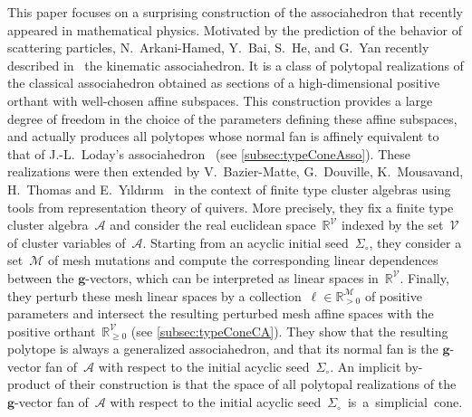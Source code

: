 \documentclass{amsart}
\theoremstyle{definition}
\newcommand{\R}{\mathbb{R}} %
\newcommand{\cal}[1]{{\mathcal{#1}}} %
\renewcommand{\b}[1]{{\boldsymbol{#1}}} %
\newcommand{\seed}{\Sigma} %
\begin{document}
This paper focuses on a surprising construction of the associahedron that recently appeared in mathematical physics.
Motivated by the prediction of the behavior of scattering particles, N.~Arkani-Hamed, Y.~Bai, S.~He, and G.~Yan recently described in~\cite[Sect.~3.2]{ArkaniHamedBaiHeYan} the kinematic associahedron.
It is a class of polytopal realizations of the classical associahedron obtained as sections of a high-dimensional positive orthant with well-chosen affine subspaces.
This construction provides a large degree of freedom in the choice of the parameters defining these affine subspaces, and actually produces all polytopes whose normal fan is affinely equivalent to that of J.-L.~Loday's associahedron~\cite{Loday} (see \cref{subsec:typeConeAsso}).
These realizations were then extended by V.~Bazier-Matte, G.~Douville, K.~Mousavand, H.~Thomas and E.~Y\i ld\i r\i m~\cite{BazierMatteDouvilleMousavandThomasYildirim} in the context of finite type cluster algebras using tools from representation theory of quivers.
More precisely, they fix a finite type cluster algebra~$\cal{A}$ and consider the real euclidean space~$\R^\cal{V}$ indexed by the set~$\cal{V}$ of cluster variables of~$\cal{A}$.
Starting from an acyclic initial seed~$\seed_\circ$, they consider a set~$\cal{M}$ of mesh mutations and compute the corresponding linear dependences between the $\b{g}$-vectors, which can be interpreted as linear spaces in~$\R^\cal{V}$.
Finally, they perturb these mesh linear spaces by a collection~$\b{\ell} \in \R_{>0}^{\cal{M}}$ of positive parameters and intersect the resulting perturbed mesh affine spaces with the positive orthant~$\R_{\ge 0}^\cal{V}$ (see \cref{subsec:typeConeCA}).
They show that the resulting polytope is always a generalized associahedron, and that its normal fan is the $\b{g}$-vector fan of~$\cal{A}$ with respect to the initial acyclic seed~$\seed_\circ$.
An implicit by-product of their construction is that the space of all polytopal realizations of the $\b{g}$-vector fan of~$\cal{A}$ with respect to the initial acyclic \mbox{seed~$\seed_\circ$ is a simplicial cone}.
\end{document}
